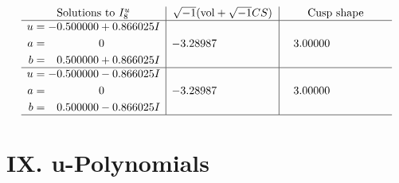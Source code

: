 \documentclass[1p]{elsarticle_modified}
\theoremstyle{definition}
\newcommand{\I}{\sqrt{-1}}
\begin{document}
$$\begin{array}{c|c|c}  
\text{Solutions to }I^u_{8}& \I (\text{vol} + \sqrt{-1}CS) & \text{Cusp shape}\\
 \hline 
\begin{aligned}
u &= -0.500000 + 0.866025 I \\
a &= \phantom{-0.000000 } 0 \\
b &= \phantom{-}0.500000 + 0.866025 I\end{aligned}
 & -3.28987\phantom{ +0.000000I} & \phantom{-}3.00000\phantom{ +0.000000I} \\ \hline\begin{aligned}
u &= -0.500000 - 0.866025 I \\
a &= \phantom{-0.000000 } 0 \\
b &= \phantom{-}0.500000 - 0.866025 I\end{aligned}
 & -3.28987\phantom{ +0.000000I} & \phantom{-}3.00000\phantom{ +0.000000I}\\
 \hline 
 \end{array}$$\newpage
\newpage\renewcommand{\arraystretch}{1}
\centering \section*{ IX. u-Polynomials}
\end{document}
